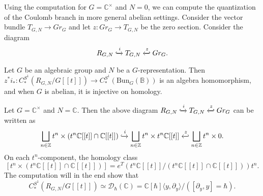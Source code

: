     Using the computation for $G = \mathbb{C}^\times$ and $N = 0$, we can compute the quantization of the Coulomb branch in more general abelian settings. Consider the vector bundle $T_{G,N} \rightarrow Gr_G$ and let $z: Gr_G \rightarrow T_{G,N}$ be the zero section. Consider the diagram
    $$R_{G,N} \xhookrightarrow{i} T_{G,N} \xhookleftarrow{z} Gr_G.$$

\begin{Theorem}
    Let $G$ be an algebraic group and $N$ be a $G$-representation. Then $z^*i_*: C_*^{S^1}(R_{G,N} / G[[t]]) \rightarrow C_*^{S^1}(\mathrm{Bun}_G(\mathbb{B}))$ is an algebra homomorphism, and when $G$ is abelian, it is injective on homology.
\end{Theorem}

\begin{Example}
    Let $G = \mathbb{C}^\times$ and $N = \mathbb{C}$. Then the above diagram $R_{G,N} \xhookrightarrow{i} T_{G,N} \xhookleftarrow{z} Gr_G$ can be written as
    $$\bigsqcup_{n \in \mathbb{Z}} t^n \times (t^n \mathbb{C}[[t]] \cap \mathbb{C}[[t]]) \xhookrightarrow{i} \bigsqcup_{n \in \mathbb{Z}} t^n \times t^n \mathbb{C}[[t]] \xhookleftarrow{z} \bigsqcup_{n \in \mathbb{Z}} t^n \times 0.$$
    On each $t^n$-component, the homology class 
    $$[t^n \times  (t^n \mathbb{C}[[t]] \cap \mathbb{C}[[t]])] = e^T(t^n\mathbb{C}[[t]] /  (t^n \mathbb{C}[[t]] \cap \mathbb{C}[[t]])) t^n.$$
    The computation will in the end show that
    $$C_*^{S^1}(R_{G,N} / G[[t]]) \simeq \mathcal{D}_\hbar (\mathbb{C}) = \mathbb{C}[\hbar] \langle y, \partial_y \rangle / ([\partial_y, y] = \hbar).$$
\end{Example}